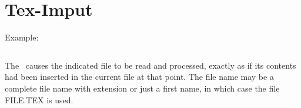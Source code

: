 \section {Tex-Imput}

Example:

\begin{verbatim}

\end{verbatim} 

The \ causes the indicated file to be read and processed,
exactly as if its contents had been inserted in the current file at that
point. The file name may be a complete file name with extension or just a
first name, in which case the file FILE.TEX is used.